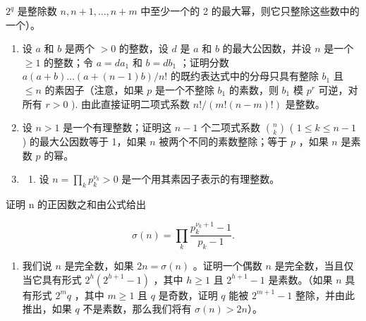 \(2^{q}\) 是整除数 \(n, n+1, \ldots, n+m\) 中至少一个的 2 的最大幂，则它只整除这些数中的一个）。

\begin{enumerate}
\def\labelenumi{\arabic{enumi})}
\setcounter{enumi}{21}
\item
  设 \(a\) 和 \(b\) 是两个 \(> 0\) 的整数，设 \(d\) 是 \(a\) 和 \(b\) 的最大公因数，并设 \(n\) 是一个 \(\geqslant 1\) 的整数；令 \(a = da_1\) 和 \(b = db_1\) ；证明分数 \(a(a + b) \ldots (a + (n - 1)b) / n!\) 的既约表达式中的分母只具有整除 \(b_1\) 且 \(\leqslant n\) 的素因子（注意，如果 \(p\) 是一个不整除 \(b_1\) 的素数，则 \(b_1\) 模 \(p^r\) 可逆，对所有 \(r > 0\) ). 由此直接证明二项式系数 \(n! / (m!(n - m)! )\) 是整数。
\item
  设 \(n > 1\) 是一个有理整数；证明这 \(n - 1\) 个二项式系数 \(\binom{n}{k}\) ( \(1 \leqslant k \leqslant n - 1\) ) 的最大公因数等于 1，如果 \(n\) 被两个不同的素数整除；等于 \(p\) ，如果 \(n\) 是素数 \(p\) 的幂。
\item
  \begin{enumerate}
  \def\labelenumii{\alph{enumii})}
  \tightlist
  \item
    设 \(n = \prod_{k} p_k^{\nu_k} > 0\) 是一个用其素因子表示的有理整数。
  \end{enumerate}
\end{enumerate}

证明 n 的正因数之和由公式给出

\[
\sigma (n) = \prod_ {k} \frac {p _ {k} ^ {\nu_ {k} + 1} - 1}{p _ {k} - 1}.
\]

\begin{enumerate}
\def\labelenumi{\alph{enumi})}
\setcounter{enumi}{1}
\tightlist
\item
  我们说 \(n\) 是完全数，如果 \(2n = \sigma(n)\) 。证明一个偶数 \(n\) 是完全数，当且仅当它具有形式 \(2^h(2^{h+1} - 1)\) ，其中 \(h \geqslant 1\) 且 \(2^{h+1} - 1\) 是素数。（如果 \(n\) 具有形式 \(2^m q\) ，其中 \(m \geqslant 1\) 且 \(q\) 是奇数，证明 \(q\) 能被 \(2^{m+1} - 1\) 整除，并由此推出，如果 \(q\) 不是素数，那么我们将有 \(\sigma(n) > 2n\)）。
\end{enumerate}

